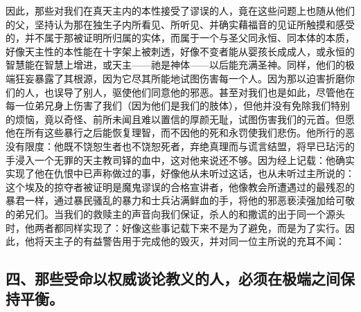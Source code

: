 因此，那些对我们在真天主内的本性接受了谬误的人，竟在这些问题上也随从他们的父，坚持认为那在独生子内所看见、所听见、并确实藉福音的见证所触摸和感受的，并不属于那被证明所归属的实体，而属于一个与圣父同永恒、同本体的本质，好像天主性的本性能在十字架上被刺透，好像不变者能从婴孩长成成人，或永恒的智慧能在智慧上增进，或天主——祂是神体——以后能充满圣神。同样，他们的极端狂妄暴露了其根源，因为它尽其所能地试图伤害每一个人。因为那以迫害折磨你们的人，也误导了别人，驱使他们同意他的邪恶。甚至对我们也是如此，尽管他在每一位弟兄身上伤害了我们（因为他们是我们的肢体），但他并没有免除我们特别的烦恼，竟以奇怪、前所未闻且难以置信的厚颜无耻，试图伤害我们的元首。但愿他在所有这些暴行之后能恢复理智，而不因他的死和永罚使我们悲伤。他所行的恶没有限度：他既不饶恕生者也不饶恕死者，弃绝真理而与谎言结盟，将早已玷污的手浸入一个无罪的天主教司铎的血中，这对他来说还不够。因为经上记载：他确实实现了他在仇恨中已声称做过的事，好像他从未听过这话，也从未听过主所说的：这个埃及的掠夺者被证明是魔鬼谬误的合格宣讲者，他像教会所遭遇过的最残忍的暴君一样，通过暴民骚乱的暴力和士兵沾满鲜血的手，将他的邪恶亵渎强加给可敬的弟兄们。当我们的救赎主的声音向我们保证，杀人的和撒谎的出于同一个源头时，他两者都同样实现了：好像这些事记载下来不是为了避免，而是为了实行。因此，他将天主子的有益警告用于完成他的毁灭，并对同一位主所说的充耳不闻：\par


\subsection{四、那些受命以权威谈论教义的人，必须在极端之间保持平衡。}

